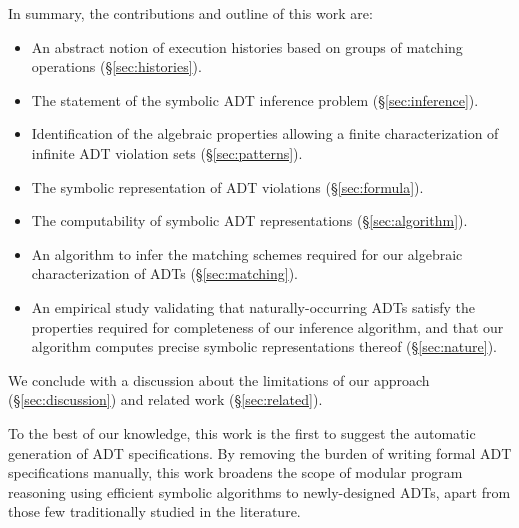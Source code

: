 In summary, the contributions and outline of this work are:
\begin{itemize}

  \item An abstract notion of execution histories based on groups of matching
  operations (§\ref{sec:histories}).

  \item The statement of the symbolic ADT inference problem (§\ref{sec:inference}).

  \item Identification of the algebraic properties allowing a finite
  characterization of infinite ADT violation sets (§\ref{sec:patterns}).

  \item The symbolic representation of ADT violations (§\ref{sec:formula}).

  \item The computability of symbolic ADT representations (§\ref{sec:algorithm}).

  \item An algorithm to infer the matching schemes required for our algebraic
  characterization of ADTs (§\ref{sec:matching}).

  \item An empirical study validating that naturally-occurring ADTs satisfy the
  properties required for completeness of our inference algorithm, and that our
  algorithm computes precise symbolic representations thereof
  (§\ref{sec:nature}).

\end{itemize}
We conclude with a discussion about the limitations of our approach
(§\ref{sec:discussion}) and related work (§\ref{sec:related}).

To the best of our knowledge, this work is the first to suggest the automatic
generation of ADT specifications. By removing the burden of writing formal ADT
specifications manually, this work broadens the scope of modular program
reasoning using efficient symbolic algorithms to newly-designed ADTs, apart from
those few traditionally studied in the literature.
